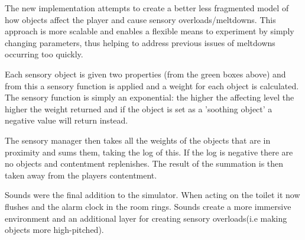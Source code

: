 The new implementation attempts to create a better less fragmented model of how objects affect the player and cause sensory overloads/meltdowns. This approach is more scalable and enables a flexible means to experiment by simply changing parameters, thus helping to address previous issues of meltdowns occurring too quickly.

Each sensory object is given two properties (from the green boxes above) and from this a sensory function is applied and a weight for each object is calculated. The sensory function is simply an exponential: the higher the affecting level the higher the weight returned and if the object is set as a 'soothing object' a negative value will return instead. 

The sensory manager then takes all the weights of the objects that are in proximity and sums them, taking the log of this. If the log is negative there are no objects and contentment replenishes. The result of the summation is then taken away from the players contentment. 

Sounds were the final addition to the simulator. When acting on the toilet it now flushes and the alarm clock in the room rings. Sounds create a more immersive environment and an additional layer for creating sensory overloads(i.e making objects more high-pitched). 